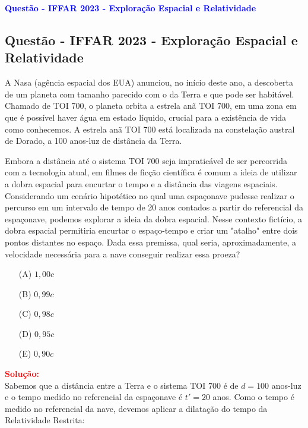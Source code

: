 \begin{flushleft}
\textbf{\textcolor{blue}{\Large Quest\~ao - IFFAR 2023 - Exploração Espacial e Relatividade}}\\
\noindent

\subsection{Quest\~ao - IFFAR 2023 - Exploração Espacial e Relatividade}

A Nasa (agência espacial dos EUA) anunciou, no início deste ano, a descoberta de um planeta com tamanho parecido com o da Terra 
e que pode ser habitável. Chamado de TOI 700, o planeta orbita a estrela anã TOI 700, em uma zona em que é possível haver água em 
estado líquido, crucial para a existência de vida como conhecemos. A estrela anã TOI 700 está localizada na constelação austral de 
Dorado, a 100 anos-luz de distância da Terra.

Embora a distância até o sistema TOI 700 seja impraticável de ser percorrida com a tecnologia atual, em filmes de ficção científica 
é comum a ideia de utilizar a dobra espacial para encurtar o tempo e a distância das viagens espaciais. Considerando um cenário 
hipotético no qual uma espaçonave pudesse realizar o percurso em um intervalo de tempo de 20 anos contados a partir do referencial 
da espaçonave, podemos explorar a ideia da dobra espacial. Nesse contexto fictício, a dobra espacial permitiria encurtar o espaço-tempo 
e criar um "atalho" entre dois pontos distantes no espaço. Dada essa premissa, qual seria, aproximadamente, a velocidade necessária para 
a nave conseguir realizar essa proeza?

\begin{itemize}
\item[(A)] $1{,}00c$
\item[(B)] $0{,}99c$
\item[(C)] $0{,}98c$
\item[(D)] $0{,}95c$
\item[(E)] $0{,}90c$
\end{itemize}

\vspace{0.5cm}

\textcolor{red}{\textbf{Solu\c{c}\~ao:}}\\

Sabemos que a distância entre a Terra e o sistema TOI 700 é de $d = 100$ anos-luz e o tempo medido no referencial da espaçonave é 
$t' = 20$ anos. Como o tempo é medido no referencial da nave, devemos aplicar a dilatação do tempo da Relatividade Restrita:


\end{flushleft}
